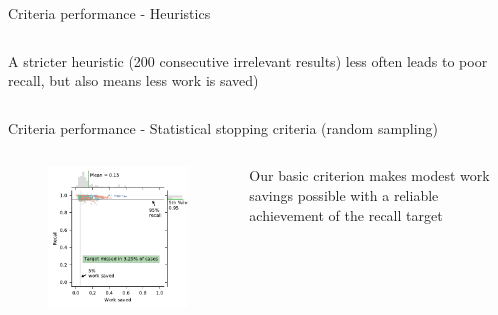 \documentclass[9pt, aspectratio=169]{beamer}
\begin{document}
\begin{frame}{Criteria performance - Heuristics}
\begin{columns}
\begin{column}{0.5\linewidth}
{			A stricter heuristic (200 consecutive irrelevant results) less often leads to poor recall, but also means less work is saved)
		}
	\end{column}
\end{columns}

\end{frame}


\begin{frame}{Criteria performance - Statistical stopping criteria (random sampling)}

\begin{columns}
	\begin{column}{0.5\linewidth}
		\begin{figure}
			\includegraphics[width=\linewidth]{../manuscript/2_figs_jointplot_hyper.pdf}
			
		\end{figure}
	\end{column}
	\begin{column}{0.5\linewidth}
		Our basic criterion makes modest work savings possible with a reliable achievement of the recall target
		
	\end{column}
\end{columns}

\end{frame}
\end{document}

